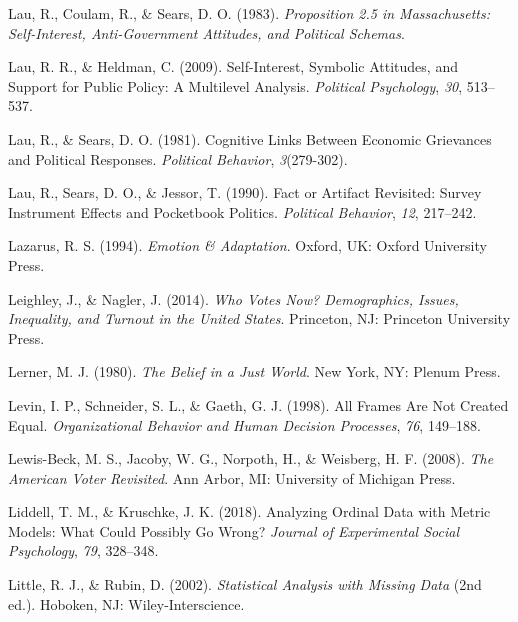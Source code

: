 \documentclass[12pt,econ]{sources/authesis}
\begin{document}
\leavevmode\hypertarget{ref-lau_proposition_1983}{}%
Lau, R., Coulam, R., \& Sears, D. O. (1983). \emph{Proposition 2.5 in Massachusetts: Self-Interest, Anti-Government Attitudes, and Political Schemas}.

\leavevmode\hypertarget{ref-lau_2030_self-interest}{}%
Lau, R. R., \& Heldman, C. (2009). Self-Interest, Symbolic Attitudes, and Support for Public Policy: A Multilevel Analysis. \emph{Political Psychology}, \emph{30}, 513--537.

\leavevmode\hypertarget{ref-lau_cognitive_1981}{}%
Lau, R., \& Sears, D. O. (1981). Cognitive Links Between Economic Grievances and Political Responses. \emph{Political Behavior}, \emph{3}(279-302).

\leavevmode\hypertarget{ref-lau_fact_1990}{}%
Lau, R., Sears, D. O., \& Jessor, T. (1990). Fact or Artifact Revisited: Survey Instrument Effects and Pocketbook Politics. \emph{Political Behavior}, \emph{12}, 217--242.

\leavevmode\hypertarget{ref-lazarus_1994_emotion}{}%
Lazarus, R. S. (1994). \emph{Emotion \& Adaptation}. Oxford, UK: Oxford University Press.

\leavevmode\hypertarget{ref-leighley_who_2014}{}%
Leighley, J., \& Nagler, J. (2014). \emph{Who Votes Now? Demographics, Issues, Inequality, and Turnout in the United States}. Princeton, NJ: Princeton University Press.

\leavevmode\hypertarget{ref-lerner_belief_1980}{}%
Lerner, M. J. (1980). \emph{The Belief in a Just World}. New York, NY: Plenum Press.

\leavevmode\hypertarget{ref-levin_1998_frames}{}%
Levin, I. P., Schneider, S. L., \& Gaeth, G. J. (1998). All Frames Are Not Created Equal. \emph{Organizational Behavior and Human Decision Processes}, \emph{76}, 149--188.

\leavevmode\hypertarget{ref-lewis-beck_2008_american}{}%
Lewis-Beck, M. S., Jacoby, W. G., Norpoth, H., \& Weisberg, H. F. (2008). \emph{The American Voter Revisited}. Ann Arbor, MI: University of Michigan Press.

\leavevmode\hypertarget{ref-liddell_2018_analyzing}{}%
Liddell, T. M., \& Kruschke, J. K. (2018). Analyzing Ordinal Data with Metric Models: What Could Possibly Go Wrong? \emph{Journal of Experimental Social Psychology}, \emph{79}, 328--348.

\leavevmode\hypertarget{ref-little_2002_statistical}{}%
Little, R. J., \& Rubin, D. (2002). \emph{Statistical Analysis with Missing Data} (2nd ed.). Hoboken, NJ: Wiley-Interscience.
\end{document}
